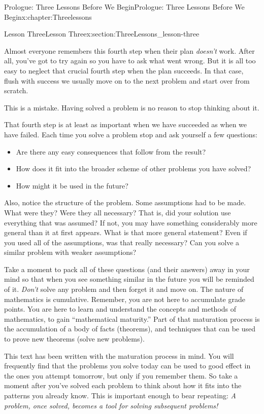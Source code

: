 \begin{chapterptx}{Prologue: Three Lessons Before We Begin}{}{Prologue: Three Lessons Before We Begin}{}{}{x:chapter:Threelessons}
\begin{sectionptx}{Lesson Three}{}{Lesson Three}{}{}{x:section:ThreeLessons_lesson-three}
		\par
		Almost everyone remembers this fourth step when their plan \emph{doesn't} work. After all, you've got to try again so you have to ask what went wrong. But it is all too easy to neglect that crucial fourth step when the plan succeeds. In that case, flush with success we usually move on to the next problem and start over from scratch.%
		\par
		This is a mistake. Having solved a problem is no reason to stop thinking about it.%
		\par
		That fourth step is at least as important when we have succeeded as when we have failed. Each time you solve a problem stop and ask yourself a few questions:%
		\begin{itemize}[label=\textbullet]
			\item{}Are there any easy consequences that follow from the result?%
			\item{}How does it fit into the broader scheme of other problems you have solved?%
			\item{}How might it be used in the future?%
		\end{itemize}
		\par
		Also, notice the structure of the problem. Some assumptions had to be made. What were they? Were they all necessary? That is, did your solution use everything that was assumed? If not, you may have something considerably more general than it at first appears. What is that more general statement? Even if you used all of the assumptions, was that really necessary? Can you solve a similar problem with weaker assumptions?%
		\par
		Take a moment to pack all of these questions (and their answers) away in your mind so that when you see something similar in the future you will be reminded of it. \emph{Don't} solve any problem and then forget it and move on. The nature of mathematics is cumulative. Remember, you are not here to accumulate grade points. You are here to learn and understand the concepts and methods of mathematics, to gain ``mathematical maturity.'' Part of that maturation process is the accumulation of a body of facts (theorems), and techniques that can be used to prove new theorems (solve new problems).%
		\par
		This text has been written with the maturation process in mind. You will frequently find that the problems you solve today can be used to good effect in the ones you attempt tomorrow, but only if you remember them. So take a moment after you've solved each problem to think about how it fits into the patterns you already know. This is important enough to bear repeating: \emph{A problem, once solved, becomes a tool for solving subsequent problems!}%

\end{sectionptx}
\end{chapterptx}
